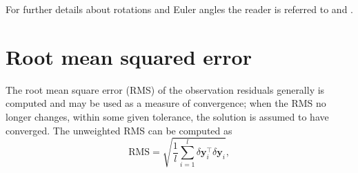 \documentclass[pdflatex,sn-mathphys-num]{sn-jnl}%
\theoremstyle{thmstyleone}%
\theoremstyle{thmstyletwo}%
\theoremstyle{thmstylethree}%
\renewcommand{\vec}[1]{\boldsymbol{#1}}
\begin{document}
\begin{appendices}


For further details about rotations and Euler angles the reader is referred to \citet{goldstein2002} and \citet{LANDAU1976}.




\section{Root mean squared error}

The root mean square error (RMS) of the observation residuals generally is computed and may be used as a measure of convergence; when the RMS no longer changes, within some given tolerance, the solution is assumed to have converged.
The unweighted RMS can be computed as
%
\begin{equation}
	\label{eq:RMS}
	\mathrm{RMS}
	=
	\sqrt{\frac{1}{l}\sum_{i=1}^{l}\delta\vec{y}_i^\top \delta\vec{y}_i},
\end{equation}




\end{appendices}
\end{document}

